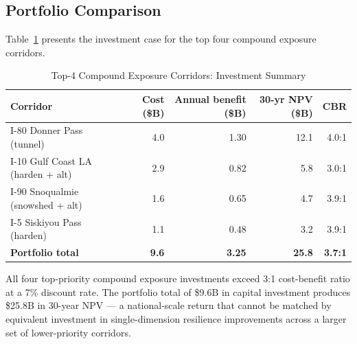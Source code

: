 \subsection{Portfolio Comparison}

Table~\ref{tab:portfolio-npv} presents the investment case for the top four compound exposure corridors.

\begin{table}[h!]
\centering
\caption{Top-4 Compound Exposure Corridors: Investment Summary}
\label{tab:portfolio-npv}
\begin{tabular}{lrrrr}
\toprule
\textbf{Corridor} & \textbf{Cost (\$B)} & \textbf{Annual benefit (\$B)} & \textbf{30-yr NPV (\$B)} & \textbf{CBR} \\
\midrule
I-80 Donner Pass (tunnel)         & 4.0 & 1.30 & 12.1 & 4.0:1  \\
I-10 Gulf Coast LA (harden + alt) & 2.9 & 0.82 & 5.8  & 3.0:1  \\
I-90 Snoqualmie (snowshed + alt)  & 1.6 & 0.65 & 4.7  & 3.9:1  \\
I-5 Siskiyou Pass (harden)        & 1.1 & 0.48 & 3.2  & 3.9:1  \\
\midrule
\textbf{Portfolio total}           & \textbf{9.6} & \textbf{3.25} & \textbf{25.8} & \textbf{3.7:1} \\
\bottomrule
\end{tabular}
\end{table}

All four top-priority compound exposure investments exceed 3:1 cost-benefit ratio at a 7\% discount rate. The portfolio total of \$9.6B in capital investment produces \$25.8B in 30-year NPV --- a national-scale return that cannot be matched by equivalent investment in single-dimension resilience improvements across a larger set of lower-priority corridors.
